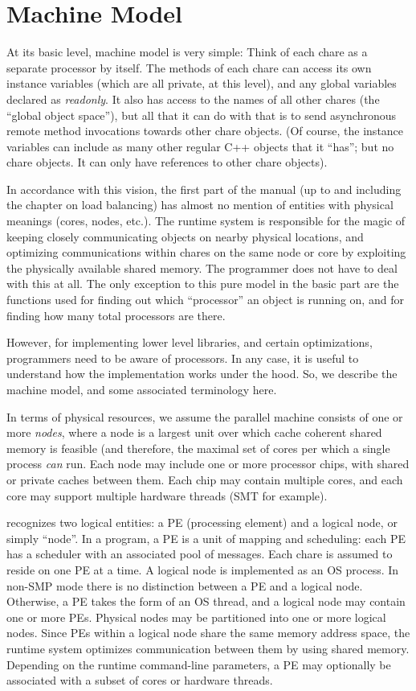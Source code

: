 \section{Machine Model}
\label{machineModel}
\label{sec:machine}
At its basic level, \charmpp{} machine model is very simple: Think of
each chare as a separate processor by itself. The methods of each
chare can access its own instance variables (which are all private, at
this level), and any global variables declared as {\em readonly}. It
also has access to the names of all other chares (the ``global object
space''), but all that it can do with that is to send asynchronous
remote method invocations towards other chare objects. (Of course, the
instance variables can include as many other regular C++ objects that
it ``has''; but no chare objects. It can only have references to other
chare objects).

In accordance with this vision, the first part of the manual (up to
and including the chapter on load balancing) has almost no mention of
entities with physical meanings (cores, nodes, etc.). The runtime
system is responsible for the magic of keeping closely communicating
objects on nearby physical locations, and optimizing communications
within chares on the same node or core by exploiting the physically
available shared memory. The programmer does not have to deal with
this at all. The only exception to this pure model in the basic part
are the functions used for finding out which ``processor'' an object
is running on, and for finding how many total processors are there.

However, for implementing lower level libraries, and certain optimizations,
programmers need to be aware of processors. In any case, it is useful
to understand how the \charmpp{} implementation works under the hood. So,
we describe the machine model, and some associated terminology here.

In terms of physical resources, we assume the parallel machine
consists of one or more {\em nodes}, where a node is a largest unit
over which cache coherent shared memory is feasible (and therefore,
the maximal set of cores per which a single process {\em can} run.
Each node may include one or more processor chips, with shared or
private caches between them. Each chip may contain multiple cores, and
each core may support multiple hardware threads (SMT for example).

\charmpp{} recognizes two logical entities: a PE (processing element) and 
a logical node, or simply ``node''. In a \charmpp{} program, a PE is a
unit of mapping and scheduling: each PE has a scheduler with an
associated pool of messages. Each chare is assumed to reside on one PE
at a time. A logical node is implemented as an OS process. In non-SMP mode
there is no distinction between a PE and a logical node. Otherwise, a PE takes
the form of an OS thread, and a logical node may contain one or more PEs.
Physical nodes may be partitioned into one or more logical nodes. Since PEs
within a logical node share the same memory address space, the \charmpp{}
runtime system optimizes communication between them by using shared memory.
Depending on the runtime command-line parameters, a PE may optionally
be associated with a subset of cores or hardware threads.

